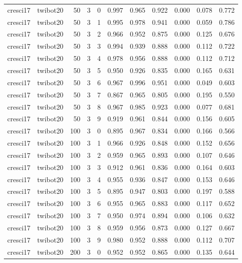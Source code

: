 \begin{tabular}{llrrrrrrrrr}
cresci17 & twibot20 & 50 & 3 & 0 & 0.997 & 0.965 & 0.922 & 0.000 & 0.078 & 0.772 \\
cresci17 & twibot20 & 50 & 3 & 1 & 0.995 & 0.978 & 0.941 & 0.000 & 0.059 & 0.786 \\
cresci17 & twibot20 & 50 & 3 & 2 & 0.966 & 0.952 & 0.875 & 0.000 & 0.125 & 0.676 \\
cresci17 & twibot20 & 50 & 3 & 3 & 0.994 & 0.939 & 0.888 & 0.000 & 0.112 & 0.722 \\
cresci17 & twibot20 & 50 & 3 & 4 & 0.978 & 0.956 & 0.888 & 0.000 & 0.112 & 0.712 \\
cresci17 & twibot20 & 50 & 3 & 5 & 0.950 & 0.926 & 0.835 & 0.000 & 0.165 & 0.631 \\
cresci17 & twibot20 & 50 & 3 & 6 & 0.967 & 0.996 & 0.951 & 0.000 & 0.049 & 0.603 \\
cresci17 & twibot20 & 50 & 3 & 7 & 0.867 & 0.965 & 0.805 & 0.000 & 0.195 & 0.550 \\
cresci17 & twibot20 & 50 & 3 & 8 & 0.967 & 0.985 & 0.923 & 0.000 & 0.077 & 0.681 \\
cresci17 & twibot20 & 50 & 3 & 9 & 0.919 & 0.961 & 0.844 & 0.000 & 0.156 & 0.605 \\
cresci17 & twibot20 & 100 & 3 & 0 & 0.895 & 0.967 & 0.834 & 0.000 & 0.166 & 0.566 \\
cresci17 & twibot20 & 100 & 3 & 1 & 0.966 & 0.926 & 0.848 & 0.000 & 0.152 & 0.656 \\
cresci17 & twibot20 & 100 & 3 & 2 & 0.959 & 0.965 & 0.893 & 0.000 & 0.107 & 0.646 \\
cresci17 & twibot20 & 100 & 3 & 3 & 0.912 & 0.961 & 0.836 & 0.000 & 0.164 & 0.603 \\
cresci17 & twibot20 & 100 & 3 & 4 & 0.955 & 0.936 & 0.847 & 0.000 & 0.153 & 0.646 \\
cresci17 & twibot20 & 100 & 3 & 5 & 0.895 & 0.947 & 0.803 & 0.000 & 0.197 & 0.588 \\
cresci17 & twibot20 & 100 & 3 & 6 & 0.955 & 0.965 & 0.883 & 0.000 & 0.117 & 0.652 \\
cresci17 & twibot20 & 100 & 3 & 7 & 0.950 & 0.974 & 0.894 & 0.000 & 0.106 & 0.632 \\
cresci17 & twibot20 & 100 & 3 & 8 & 0.959 & 0.956 & 0.873 & 0.000 & 0.127 & 0.667 \\
cresci17 & twibot20 & 100 & 3 & 9 & 0.980 & 0.952 & 0.888 & 0.000 & 0.112 & 0.707 \\
cresci17 & twibot20 & 200 & 3 & 0 & 0.952 & 0.952 & 0.865 & 0.000 & 0.135 & 0.644 \\

\end{tabular}
